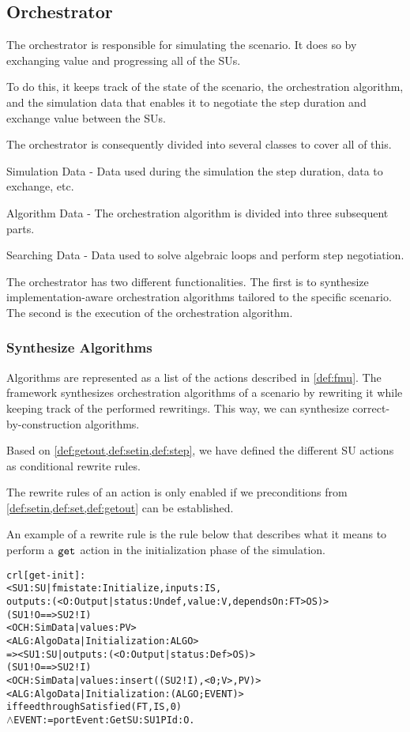 \subsection{Orchestrator}
The orchestrator is responsible for simulating the scenario.
It does so by exchanging value and progressing all of the SUs.

To do this, it keeps track of the state of the scenario, the orchestration algorithm, and the simulation data that enables it to negotiate the step duration and exchange value between the SUs.

The orchestrator is consequently divided into several classes to cover all of this.
\begin{compactitem}
  \item Simulation Data - Data used during the simulation the step duration, data to exchange, etc.
  \item Algorithm Data - The orchestration algorithm is divided into three subsequent parts. 
  \item Searching Data - Data used to solve algebraic loops and perform step negotiation.
\end{compactitem}

The orchestrator has two different functionalities.
The first is to synthesize implementation-aware orchestration algorithms tailored to the specific scenario.
The second is the execution of the orchestration algorithm. 

\subsubsection{Synthesize Algorithms}
Algorithms are represented as a list of the actions described in \cref{def:fmu}.
The framework synthesizes orchestration algorithms of a scenario by rewriting it while keeping track of the performed rewritings.
This way, we can synthesize correct-by-construction algorithms.

Based on \cref{def:getout,def:setin,def:step}, we have defined the different SU actions as conditional rewrite rules.

The rewrite rules of an action is only enabled if we preconditions from \cref{def:setin,def:set,def:getout} can be established.

An example of a rewrite rule is the rule below that describes what it means to perform a $\mathtt{get}_{}$ action in the initialization phase of the simulation.

\begin{alltt}
  \small
  crl [get-init] :
  < SU1 : SU | fmistate : Initialize, inputs : IS, 
    outputs : (< O : Output | status : Undef, value : V, dependsOn : FT > OS) > 
  (SU1 ! O ==> SU2 ! I)
  < OCH : SimData | values : PV > 
  < ALG : AlgoData | Initialization : ALGO >
  => < SU1 : SU | outputs : (< O : Output | status : Def > OS) > 
    (SU1 ! O ==> SU2 ! I)
    < OCH : SimData | values : insert((SU2 ! I), < 0 ; V >, PV) >  
    < ALG : AlgoData | Initialization : (ALGO ; EVENT) >
if feedthroughSatisfied(FT, IS, 0)
  \(\land\) EVENT := portEvent: Get SU: SU1 PId: O . 
\end{alltt}

